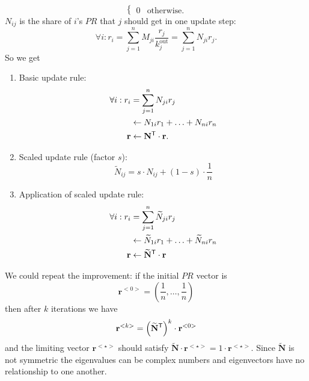 \documentclass[a4paper,9pt]{extarticle}
\begin{document}
\begin{multicols*}{2}
\begin{equation*}
\begin{cases}
				0&\text{otherwise.}
			\end{cases}
		\end{equation*}
		$N_{ij}$ is the share of $i$'s $PR$ that $j$ should get in one update step:
		\begin{equation*}
			\forall i:r_{i}=\sum_{j=1}^{n}M_{ji}\frac{r_{j}}{k_{j}^{\mathrm{out}}}=\sum_{j=1}^{n}N_{ji}r_{j}.
		\end{equation*}
		So we get
		\begin{riquadro}
			\begin{enumerate}
				\item Basic update rule:
				\begin{align*}
					\forall i:r_{i}&=\sum_{j=1}^{n}N_{ji}r_{j}\\
					&\leftarrow N_{1i}r_{1}+\ldots+N_{ni}r_{n}\\
					\mathbf{r}&\leftarrow{\mathbf{N}}^{\mathsf{T}}\cdot\mathbf{r}.
				\end{align*}
				\item Scaled update rule (factor $s$):
				\begin{equation*}
					\widetilde{N}_{ij}=s\cdot N_{ij}+(1-s)\cdot\frac{1}{n}
				\end{equation*}
				\item Application of scaled update rule:
				\begin{align*}
					\forall i:r_{i}&=\sum_{j=1}^{n}\widetilde{N}_{ji}r_{j}\\
					&\leftarrow\widetilde{N}_{1i}r_{1}+\ldots+\widetilde{N}_{ni}r_{n}\\
					\mathbf{r}&\leftarrow{\widetilde{\mathbf{N}}}^{\mathsf{T}}\cdot\mathbf{r}
				\end{align*}
			\end{enumerate}
		\end{riquadro}
		We could repeat the improvement: if the initial $PR$ vector is
		\begin{equation*}
			\mathbf{r}^{<0>}=\left(\frac{1}{n},\ldots,\frac{1}{n}\right)
		\end{equation*}
		then after $k$ iterations we have
		\begin{equation*}
			\mathbf{r}^{<k>}=\left({\widetilde{\mathbf{N}}}^{\mathsf{T}}\right)^{k}\cdot\mathbf{r}^{<0>}
		\end{equation*}
		and the limiting vector $\mathbf{r}^{<\star>}$ should satisfy $\widetilde{\mathbf{N}}\cdot\mathbf{r}^{<\star>}=1\cdot\mathbf{r}^{<\star>}$. Since $\widetilde{\mathbf{N}}$ is not symmetric the eigenvalues can be complex numbers and eigenvectors have no relationship to one another.

\end{multicols*}
\end{document}
